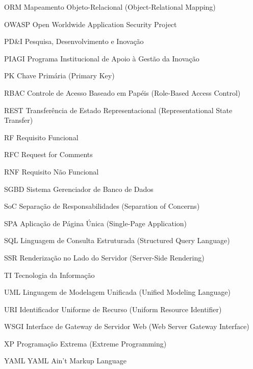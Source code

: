 \begin{siglas}
	\item[ORM]     Mapeamento Objeto-Relacional (Object-Relational Mapping)
	\item[OWASP]   Open Worldwide Application Security Project
	\item[PD\&I]   Pesquisa, Desenvolvimento e Inovação
	\item[PIAGI]   Programa Institucional de Apoio à Gestão da Inovação
	\item[PK]      Chave Primária (Primary Key)
	\item[RBAC]    Controle de Acesso Baseado em Papéis (Role-Based Access Control)
	\item[REST]    Transferência de Estado Representacional (Representational State Transfer)
	\item[RF]      Requisito Funcional
	\item[RFC]     Request for Comments
	\item[RNF]     Requisito Não Funcional
	\item[SGBD]    Sistema Gerenciador de Banco de Dados
	\item[SoC]     Separação de Responsabilidades (Separation of Concerns)
	\item[SPA]     Aplicação de Página Única (Single-Page Application)
	\item[SQL]     Linguagem de Consulta Estruturada (Structured Query Language)
	\item[SSR]     Renderização no Lado do Servidor (Server-Side Rendering)
	\item[TI]      Tecnologia da Informação
	\item[UML]     Linguagem de Modelagem Unificada (Unified Modeling Language)
	\item[URI]     Identificador Uniforme de Recurso (Uniform Resource Identifier)
	\item[WSGI]    Interface de Gateway de Servidor Web (Web Server Gateway Interface)
	\item[XP]      Programação Extrema (Extreme Programming)
	\item[YAML]    YAML Ain't Markup Language
\end{siglas}

\cleardoublepage